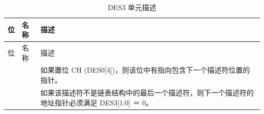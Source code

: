 \begin{longtable}[c]{ |p{3cm}|p{4cm}|p{8cm}| }
\caption{DES3 单元描述} \label{tab:sdhost-DES3}\\
\hline
{}
位 &名称 & 描述 \\
\hline
\endfirsthead
\hline
{}
位 &名称 & 描述  \\
\hline
\endhead
\endfoot
{}& & 如果置位 CH (DES0[4])，则该位中有指向包含下一个描述符位置的指针。\\
&&如果该描述符不是链表结构中的最后一个描述符，则下一个描述符的地址指针必须满足 DES3[1:0] ＝ 0。\\\hline
\end{longtable}
